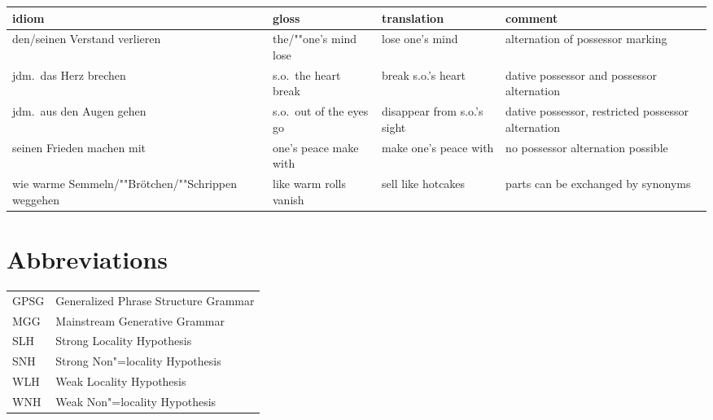\documentclass[output=paper
 	        ,biblatex
                ,babelshorthands
                ,newtxmath
                ,draftmode
                ,colorlinks, citecolor=brown
]{langscibook}
\begin{document}
\begin{sideways}
\begin{tabular}{@{}L{4cm}lL{4.0cm}L{4.0cm}}
idiom & gloss & translation & comment\\\hline
%
 {den/seinen Verstand verlieren}
 & {the/""one's mind lose}
 & {lose one's mind}
 & {alternation of possessor marking}
 \\
 {jdm.\ das Herz brechen} & s.o.\ the heart break & break s.o.'s heart
 & {dative possessor and possessor alternation}\\
 {jdm.\ aus den Augen gehen} & s.o.\ out of the eyes go
 & {disappear from s.o.'s sight} &
 {dative possessor, restricted possessor alternation}\\
 {seinen Frieden machen mit}
 & {one's peace make with}
 & {make one's peace with}
 & {no possessor alternation possible}\\
 {wie warme Semmeln/""Brötchen/""Schrippen weggehen}
 & {like warm rolls vanish} & sell like hotcakes & 
 {parts can be exchanged by synonyms}\\
\end{tabular}
\end{sideways}

\section*{Abbreviations}

\begin{tabular}{@{}ll}
GPSG & Generalized Phrase Structure Grammar \citep{GKPS85a}\\
MGG & Mainstream Generative Grammar\\
SLH & Strong Locality Hypothesis\\%
SNH & Strong Non"=locality Hypothesis\\%
WLH & Weak Locality Hypothesis\\%
WNH & Weak Non"=locality Hypothesis\\%
\end{tabular}

\section*{\acknowledgmentsUS}
\end{document}
